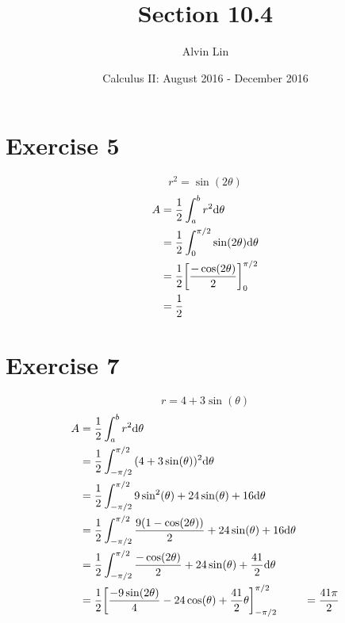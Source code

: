 \documentclass{math}
\title{Section 10.4}
\author{Alvin Lin}
\date{Calculus II: August 2016 - December 2016}
\begin{document}
\maketitle

\section*{Exercise 5}
\[ r^{2} = \sin(2\theta) \]
\begin{align*}
  A &= \frac{1}{2}\int_{a}^{b}{r^{2}\mathrm{d}{\theta}} \\
  &= \frac{1}{2}\int_{0}^{\pi/2}{\sin(2\theta)\mathrm{d}{\theta}} \\
  &= \frac{1}{2}\bigg[\frac{-\cos(2\theta)}{2}\bigg]_{0}^{\pi/2} \\
  &= \frac{1}{2}
\end{align*}

\section*{Exercise 7}
\[ r = 4+3\sin(\theta) \]
\begin{align*}
  A &= \frac{1}{2}\int_{a}^{b}{r^{2}\mathrm{d}{\theta}} \\
  &= \frac{1}{2}\int_{-\pi/2}^{\pi/2}{(4+3\sin(\theta))^{2}\mathrm{d}{\theta}} \\
  &= \frac{1}{2}\int_{-\pi/2}^{\pi/2}
    {9\sin^{2}(\theta)+24\sin(\theta)+16\mathrm{d}{\theta}} \\
  &= \frac{1}{2}\int_{-\pi/2}^{\pi/2}
    {\frac{9(1-\cos(2\theta))}{2}+24\sin(\theta)+16\mathrm{d}{\theta}} \\
  &= \frac{1}{2}\int_{-\pi/2}^{\pi/2}
    {\frac{-\cos(2\theta)}{2}+24\sin(\theta)+\frac{41}{2}\mathrm{d}{\theta}} \\
  &= \frac{1}{2}\bigg[
    \frac{-9\sin(2\theta)}{4}-24\cos(\theta)+
      \frac{41}{2}\theta\bigg]_{-\pi/2}^{\pi/2}
  &= \frac{41\pi}{2}
\end{align*}
\end{document}
